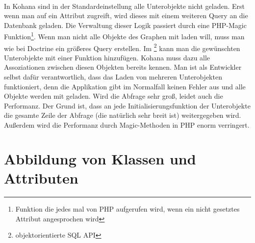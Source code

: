 \\
In Kohana sind in der Standardeinstellung alle Unterobjekte nicht geladen. Erst wenn man auf ein Attribut zugreift, wird dieses mit einem weiteren Query an die Datenbank geladen. Die Verwaltung dieser Logik passiert durch eine PHP-Magic Funktion\footnote{Funktion die jedes mal von PHP aufgerufen wird, wenn ein nicht gesetztes Attribut angesprochen wird}. Wenn man nicht alle Objekte des Graphen mit  laden will, muss man wie bei Doctrine ein größeres Query erstellen. Im \footnote{objektorientierte SQL API} kann man die gewünschten Unterobjekte mit einer Funktion hinzufügen. Kohana muss dazu alle Assoziationen zwischen diesen Objekten bereits kennen. Man ist als Entwickler selbst dafür verantwortlich, dass das Laden von mehreren Unterobjekten funktioniert, denn die Applikation gibt im Normalfall keinen Fehler aus und alle Objekte werden mit  geladen. Wird die Abfrage sehr groß, leidet auch die Performanz. Der Grund ist, dass an jede Initialisierungsfunktion der Unterobjekte die gesamte Zeile der Abfrage (die natürlich sehr breit ist) weitergegeben wird. Außerdem wird die Performanz durch Magic-Methoden in PHP enorm verringert. \\

\section{Abbildung von Klassen und Attributen}

